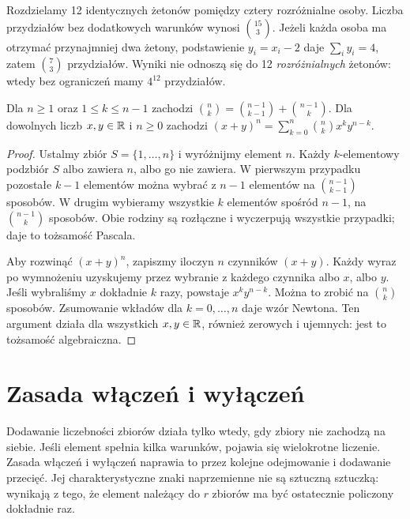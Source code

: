 \begin{przyklad}
Rozdzielamy 12 identycznych żetonów pomiędzy cztery rozróżnialne osoby.
Liczba przydziałów bez dodatkowych warunków wynosi $\binom{15}{3}$.
Jeżeli każda osoba ma otrzymać przynajmniej dwa żetony, podstawienie
$y_i=x_i-2$ daje $\sum_i y_i=4$, zatem $\binom73$ przydziałów.
Wyniki nie odnoszą się do 12 \emph{rozróżnialnych} żetonów:
wtedy bez ograniczeń mamy $4^{12}$ przydziałów.
\end{przyklad}

\begin{stwierdzenie}
Dla $n\geq1$ oraz $1\leq k\leq n-1$ zachodzi
$\binom nk=\binom{n-1}{k-1}+\binom{n-1}k$. Dla dowolnych liczb
$x,y\in\mathbb{R}$ i $n\geq0$ zachodzi
$(x+y)^n=\sum_{k=0}^n\binom nk x^k y^{n-k}$.
\end{stwierdzenie}
\begin{proof}
Ustalmy zbiór $S=\{1,\ldots,n\}$ i wyróżnijmy element
$n$. Każdy $k$-elementowy podzbiór $S$ albo zawiera $n$,
albo go nie zawiera. W pierwszym przypadku pozostałe
$k-1$ elementów można wybrać z $n-1$ elementów na
$\binom{n-1}{k-1}$ sposobów. W drugim wybieramy wszystkie
$k$ elementów spośród $n-1$, na $\binom{n-1}{k}$
sposobów. Obie rodziny są rozłączne i wyczerpują wszystkie
przypadki; daje to tożsamość Pascala.

Aby rozwinąć $(x+y)^n$, zapiszmy iloczyn $n$ czynników
$(x+y)$. Każdy wyraz po wymnożeniu uzyskujemy przez
wybranie z każdego czynnika albo $x$, albo $y$.
Jeśli wybraliśmy $x$ dokładnie $k$ razy, powstaje
$x^ky^{n-k}$. Można to zrobić na $\binom nk$ sposobów.
Zsumowanie wkładów dla $k=0,\ldots,n$ daje wzór Newtona.
Ten argument działa dla wszystkich $x,y\in\mathbb{R}$, również
zerowych i ujemnych: jest to tożsamość algebraiczna.
\end{proof}

\section{Zasada włączeń i wyłączeń}
Dodawanie liczebności zbiorów działa tylko wtedy, gdy zbiory
nie zachodzą na siebie. Jeśli element spełnia kilka warunków,
pojawia się wielokrotne liczenie. Zasada włączeń i wyłączeń
naprawia to przez kolejne odejmowanie i dodawanie przecięć.
Jej charakterystyczne znaki naprzemienne nie są sztuczną sztuczką:
wynikają z tego, że element należący do $r$ zbiorów ma być
ostatecznie policzony dokładnie raz.

